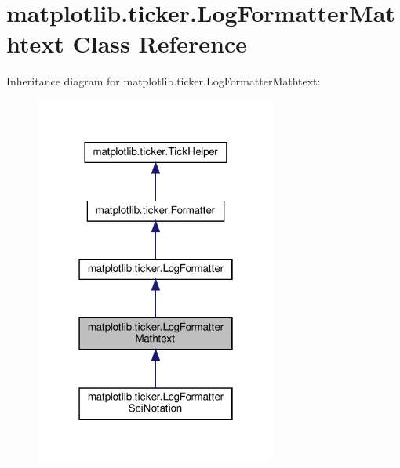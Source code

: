 \hypertarget{classmatplotlib_1_1ticker_1_1LogFormatterMathtext}{}\section{matplotlib.\+ticker.\+Log\+Formatter\+Mathtext Class Reference}
\label{classmatplotlib_1_1ticker_1_1LogFormatterMathtext}


Inheritance diagram for matplotlib.\+ticker.\+Log\+Formatter\+Mathtext\+:
\nopagebreak
\begin{figure}[H]
\begin{center}
\leavevmode
\includegraphics[width=226pt]{classmatplotlib_1_1ticker_1_1LogFormatterMathtext__inherit__graph}
\end{center}
\end{figure}


